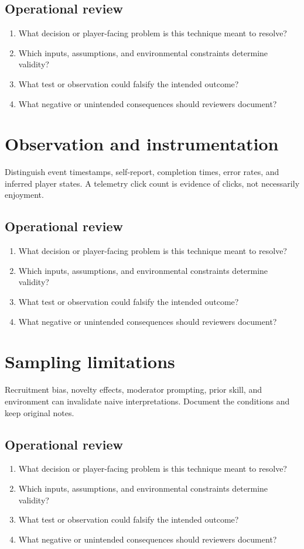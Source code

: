 \documentclass[11pt]{article}
\begin{document}
\subsection{Operational review}
\begin{enumerate}
\item What decision or player-facing problem is this technique meant to resolve?
\item Which inputs, assumptions, and environmental constraints determine validity?
\item What test or observation could falsify the intended outcome?
\item What negative or unintended consequences should reviewers document?
\end{enumerate}

\section{Observation and instrumentation}
Distinguish event timestamps, self-report, completion times, error rates, and inferred player states. A telemetry click count is evidence of clicks, not necessarily enjoyment.


\subsection{Operational review}
\begin{enumerate}
\item What decision or player-facing problem is this technique meant to resolve?
\item Which inputs, assumptions, and environmental constraints determine validity?
\item What test or observation could falsify the intended outcome?
\item What negative or unintended consequences should reviewers document?
\end{enumerate}

\section{Sampling limitations}
Recruitment bias, novelty effects, moderator prompting, prior skill, and environment can invalidate naive interpretations. Document the conditions and keep original notes.


\subsection{Operational review}
\begin{enumerate}
\item What decision or player-facing problem is this technique meant to resolve?
\item Which inputs, assumptions, and environmental constraints determine validity?
\item What test or observation could falsify the intended outcome?
\item What negative or unintended consequences should reviewers document?
\end{enumerate}
\end{document}
